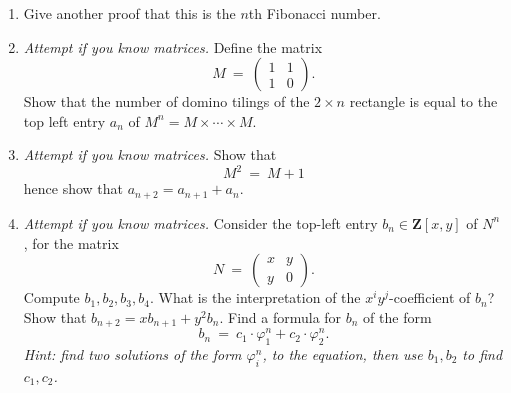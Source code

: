 \documentclass[11pt,fleqn]{book} %
\begin{document}
\begin{problem}
\begin{enumerate}[label=\alph*.]
\begin{center}
        \end{center}
     \item Give another proof that this is the $n$th Fibonacci number.
    \item \textit{Attempt if you know matrices.} Define the matrix 
    $$M \ = \ \begin{pmatrix} 
     1 &1 \\ 
     1 &0 
     \end{pmatrix}.$$
     Show that the number of domino tilings of the $2\times n$ rectangle is equal to the top left entry $a_n$ of $M^n=M\times \cdots\times M$. 
     \item \textit{Attempt if you know matrices.} Show that 
     $$M^2 \ = \ M + 1$$
     hence show that $a_{n+2} = a_{n+1} + a_n$.
     \item \textit{Attempt if you know matrices.} Consider the top-left entry $b_n\in \mathbf{Z}[x,y]$ of $N^n$, for the matrix
     $$N \ = \ \begin{pmatrix} 
     x &y \\ 
     y &0 
     \end{pmatrix}.$$
     Compute $b_1,b_2,b_3,b_4$. What is the interpretation of the $x^iy^j$-coefficient of $b_n$? Show that $b_{n+2} = x b_{n+1} + y^2 b_n$. Find a formula for $b_n$ of the form 
     $$b_n \ = \ c_1 \cdot \varphi_1^n + c_2 \cdot \varphi_2^n.$$
     \textit{Hint: find two solutions of the form $\varphi_i^n$, to the equation, then use $b_1,b_2$ to find $c_1,c_2$. }
\end{enumerate}
\end{problem}
\end{document}
